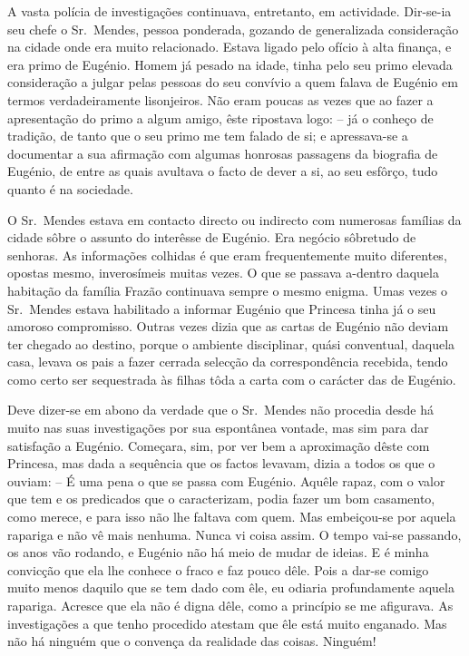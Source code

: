 \documentclass[9pt]{article}
\begin{document}
A vasta polícia de investiga\-ções continuava, entretanto, em actividade. Dir-se-ia seu chefe o Sr.\ Mendes, pessoa ponderada, gozando de
generalizada considera\-ção na cidade onde era muito relacionado. Estava ligado pelo ofício à alta finan\-ça, e era primo de Eugé\-nio. Homem
já pesado na idade, tinha pelo seu primo elevada considera\-ção a julgar pelas pessoas do seu con\-ví\-vio a quem falava de Eugé\-nio em termos
verdadeiramente lisonjeiros. Não eram poucas as vezes que ao fazer
a apresenta\-ção do primo a algum amigo, êste ripostava logo: -- já o conheço de tradi\-ção, de tanto que o seu primo me tem falado de si; e
apressava-se a documentar a sua afirma\-ção com algumas honrosas passagens da biografia de Eugé\-nio, de entre as quais avultava o facto
de dever a si, ao seu esfôrço, tudo quanto é na sociedade.

O Sr.\ Mendes estava em contacto directo ou indirecto com numerosas fa\-mí\-lias da cidade sôbre o assunto do interêsse de Eugé\-nio. Era
negócio sôbretudo de senhoras. As informa\-ções co\-lhidas é que eram
frequentemente muito diferentes, opostas mesmo, inverosímeis muitas
vezes. O que se passava a-dentro daquela habita\-ção da fa\-mí\-lia Frazão
continuava sempre o mesmo enigma. Umas vezes o Sr.\ Mendes estava habilitado a informar Eugé\-nio que Princesa tinha já o seu amoroso compromisso. Outras vezes dizia que as cartas de Eugé\-nio não deviam ter
chegado ao destino, porque o ambiente disciplinar, quási conventual,
daquela casa, levava os pais a fazer cerrada selec\-ção da correspondên\-cia recebida, tendo como certo ser sequestrada às fi\-lhas tôda a carta
com o carácter das de Eugé\-nio.

Deve dizer-se em abono da verdade que o Sr.\ Mendes não procedia
desde há muito nas suas investiga\-ções por sua espontânea vontade, mas
sim para dar satisfa\-ção a Eugé\-nio. Começara, sim, por ver bem a aproxima\-ção dêste com Princesa, mas dada a sequência que os factos levavam,
dizia a todos os que o ouviam: -- É uma pena o que se passa com Eugé\-nio. Aquêle rapaz, com o valor que tem e os predicados que o ca\-ra\-cte\-ri\-zam, podia fazer um bom casamento, como merece, e para isso não lhe
faltava com quem. Mas embeiçou-se por aquela rapariga e não vê mais
nenhuma. Nunca vi coisa assim. O tempo vai-se passando, os anos vão
rodando, e Eugé\-nio não há meio de mudar de ideias. E é minha convic\-ção que ela lhe conhece o fraco e faz pouco dêle. Pois a dar-se comigo muito menos daquilo que se tem dado com êle, eu odiaria profundamente aquela rapariga. Acresce que ela não é digna dêle, como a princípio se me afigurava. As investiga\-ções a que tenho procedido atestam que êle está
muito enganado. Mas não há nin\-guém que o convença da realidade das coisas. Ninguém!
\end{document}

